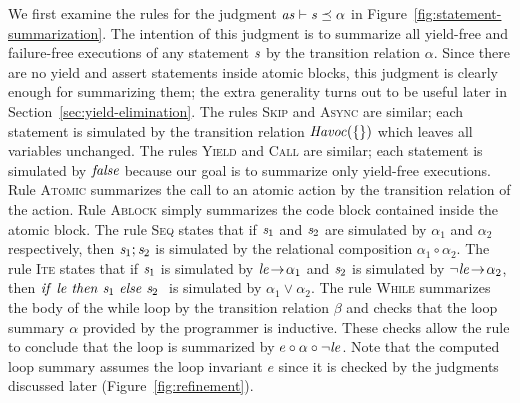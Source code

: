 We first examine the rules for the judgment $\mathit{as} \vdash \mathit{s} \preceq \alpha$ in Figure~\ref{fig:statement-summarization}.
The intention of this judgment is to summarize all yield-free and failure-free executions of any statement $\mathit{s}$ by the transition relation $\alpha$.
Since there are no yield and assert statements inside atomic blocks, this judgment is clearly enough for summarizing them;
the extra generality turns out to be useful later in Section~\ref{sec:yield-elimination}.
The rules \textsc{Skip} and \textsc{Async} are similar;
each statement is simulated by the transition relation $\mathit{Havoc}(\{\})$ which leaves all variables unchanged.
The rules \textsc{Yield} and \textsc{Call} are similar;
each statement is simulated by $\mathit{false}$ because our goal is to summarize only yield-free executions.
Rule \textsc{Atomic} summarizes the call to an atomic action by the transition relation of the action.
Rule \textsc{Ablock} simply summarizes the code block contained inside the atomic block.
The rule \textsc{Seq} states that if $\mathit{s}_1$ and $\mathit{s}_2$ are simulated by $\alpha_1$ and $\alpha_2$ respectively, 
then $\mathit{s}_1;\mathit{s}_2$ is simulated by the relational composition $\alpha_1 \circ \alpha_2$.
The rule \textsc{Ite} states that if $\mathit{s}_1$ is simulated by ${\mathit{le}}\!\rightarrow\!{\alpha_1}$ and 
$\mathit{s}_2$ is simulated by ${\neg \mathit{le}}\!\rightarrow\!{\alpha_2}$,
then ${\mathit{if}\ {\mathit{le}}\ }{\mathit{then}\ {\mathit{s}_1}\ }{\mathit{else}\ {\mathit{s}_2}\ }$ is simulated by $\alpha_1 \vee \alpha_2$.
The rule \textsc{While} summarizes the body of the while loop by the transition relation $\beta$ and checks that the 
loop summary $\alpha$ provided by the programmer is inductive.
These checks allow the rule to conclude that the loop is summarized by $e \circ \alpha \circ \neg \mathit{le}$.
Note that the computed loop summary assumes the loop invariant $e$ since it is checked by the judgments 
discussed later (Figure~\ref{fig:refinement}).

